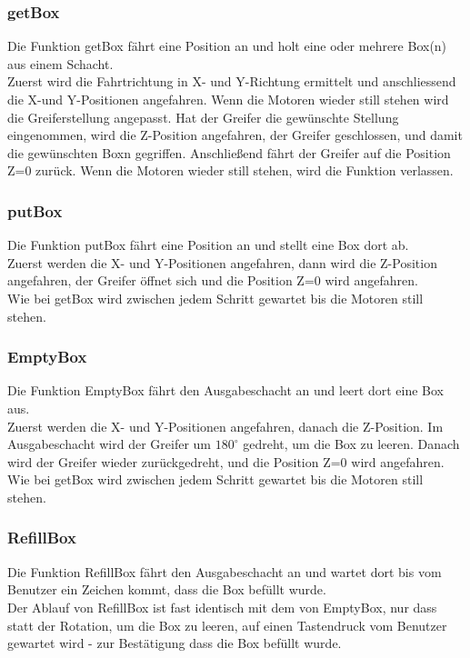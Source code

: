 \documentclass{scrartcl}
\begin{document}
\subsubsection{getBox}
Die Funktion getBox fährt eine Position an und holt eine oder mehrere Box(n) aus einem Schacht. \\
Zuerst wird die Fahrtrichtung in X- und Y-Richtung ermittelt und anschliessend die X-und Y-Positionen angefahren. Wenn die Motoren wieder still stehen wird die Greiferstellung angepasst. Hat der Greifer die gewünschte Stellung eingenommen, wird die Z-Position angefahren, der Greifer geschlossen, und damit die gewünschten Boxn gegriffen. Anschließend fährt der Greifer auf die Position Z=0 zurück. Wenn die Motoren wieder still stehen, wird die Funktion verlassen.


\subsubsection{putBox}
Die Funktion putBox fährt eine Position an und stellt eine Box dort ab.\\
Zuerst werden die X- und Y-Positionen angefahren, dann wird die Z-Position angefahren, der Greifer öffnet sich und die Position Z=0 wird angefahren.\\
Wie bei getBox wird zwischen jedem Schritt gewartet bis die Motoren still stehen.


\subsubsection{EmptyBox}
Die Funktion EmptyBox fährt den Ausgabeschacht an und leert dort eine Box aus.\\
Zuerst werden die X- und Y-Positionen angefahren, danach die Z-Position. Im Ausgabeschacht wird der Greifer um $180^{\circ}$ gedreht, um die Box zu leeren. Danach wird der Greifer wieder zurückgedreht, und die Position Z=0 wird angefahren.\\
Wie bei getBox wird zwischen jedem Schritt gewartet bis die Motoren still stehen.


\subsubsection{RefillBox}
Die Funktion RefillBox fährt den Ausgabeschacht an und wartet dort bis vom Benutzer ein Zeichen kommt, dass die Box befüllt wurde.\\
Der Ablauf von RefillBox ist fast identisch mit dem von EmptyBox, nur dass statt der Rotation, um die Box zu leeren, auf einen Tastendruck vom Benutzer gewartet wird - zur Bestätigung dass die Box befüllt wurde.



\appendix




\end{document}
